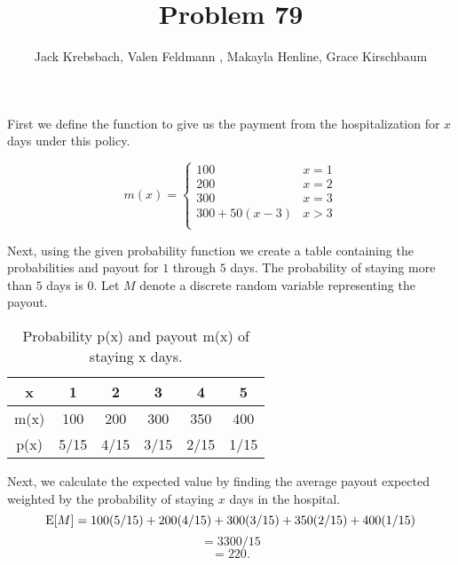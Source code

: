 \documentclass{report}
\title{Problem 79}
\author{Jack Krebsbach, Valen Feldmann , Makayla Henline, Grace Kirschbaum }
\date{}
\begin{document}
\maketitle


\sol

First we define the function to give us the payment from the hospitalization for $x$ days under this policy.

$$m(x)= \begin{cases}
  100 & x = 1 \\
  200 & x = 2 \\
  300 & x = 3 \\
  300 + 50(x-3) & x > 3 \\
\end{cases}$$


Next, using the given probability function we create a table containing the probabilities and payout for $1$ through $5$ days. The probability of staying more than $5$ days is $0$. Let $M$ denote a discrete random variable representing the payout.

\begin{table}[h!]
\centering
\begin{tabular}{c | c c c c c }
  x & 1 & 2 & 3 & 4   & 5 \\  \hline
  m(x) & 100 & 200 & 300 & 350  & 400\\ \hline
  p(x) & 5/15 & 4/15 & 3/15 & 2/15 & 1/15\\ 
\end{tabular}
\caption{Probability p(x) and payout m(x) of staying x days.}
\label{table:example}
\end{table}


Next, we calculate the expected value by finding the average payout expected weighted by the probability of staying $x$ days in the hospital. 
$$ \operatorname{E}[M]= 100(5/15) + 200(4/15)+ 300(3/15) + 350(2/15) + 400(1/15)$$ 
$$ = 3300/15 $$
$$ = 220.$$
\end{document}
